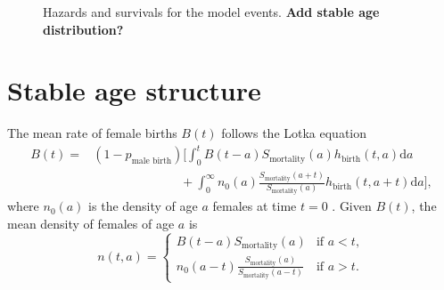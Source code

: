 \documentclass[12pt]{article}
\newcommand{\md}{\mathrm{d}}
\begin{document}
\begin{figure}
  \centering
  
  \caption{Hazards and survivals for the model events.
    \textbf{Add stable age distribution?}}
  \label{fig:distributions}
\end{figure}


\section{Stable age structure}
\label{stable_age_structure}

The mean rate of female births $B(t)$
follows the Lotka equation
\begin{equation}
  \label{lotka}
  \begin{split}
    B(t) =&
    (1 - p_{\text{male birth}}) \bigg[
      \int_0^t B(t - a)
      S_{\text{mortality}}(a)
      h_{\text{birth}}(t, a) \md a
    \\
    & \quad\quad\quad\quad\quad\quad\quad {} +
      \int_0^{\infty} n_0(a)
      \frac{S_{\text{mortality}}(a + t)}{S_{\text{mortality}}(a)}
      h_{\text{birth}}(t, a + t) \md a
    \bigg],
  \end{split}
\end{equation}
where $n_0(a)$ is the density of age $a$ females at time $t = 0$
\citetext{\citealp[Chapter VI, Section 29 on
  pp.~159--161]{harris_1963};
  \citealp[Chapter 20 on pp.~353--364]{kot_01}}.
Given $B(t)$, the mean density of females of age $a$ is
\begin{equation}
  n(t, a) =
  \begin{cases}
    B(t - a) S_{\text{mortality}}(a)
    & \text{if $a < t$},
    \\
    n_0(a - t)
    \frac{S_{\text{mortality}}(a)}{S_{\text{mortality}}(a - t)}
    & \text{if $a > t$}.
  \end{cases}
\end{equation}
\end{document}

